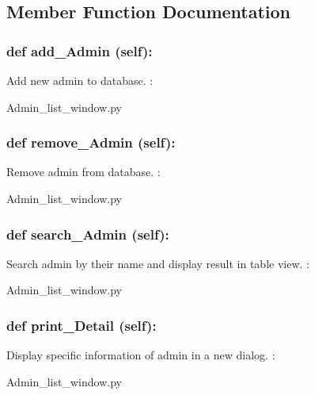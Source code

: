 \subsection{Member Function Documentation}
\hypertarget{class_poly_a14a7ad77ce612b0c54f531d307ee4b39}{
\subsubsection[{def add_Admin (self):}]{\setlength{\rightskip}{0pt plus 5cm}def {add\_Admin} (self):}}\label{class_poly_a14a7ad77ce612b0c54f531d307ee4b39}
Add new admin to database.
:\begin{DoxyCompactItemize}
\item 
Admin\_list\_window.\-py\end{DoxyCompactItemize}

\hypertarget{class_poly_a14a7ad77ce612b0c54f531d307ee4b39}{
\subsubsection[{def remove_Admin (self):}]{\setlength{\rightskip}{0pt plus 5cm}def {remove\_Admin} (self):}}\label{class_poly_a14a7ad77ce612b0c54f531d307ee4b39}
Remove admin from database.
:\begin{DoxyCompactItemize}
\item 
Admin\_list\_window.\-py\end{DoxyCompactItemize}

\hypertarget{class_poly_a14a7ad77ce612b0c54f531d307ee4b39}{
\subsubsection[{def search_Admin (self):}]{\setlength{\rightskip}{0pt plus 5cm}def {search\_Admin} (self):}}\label{class_poly_a14a7ad77ce612b0c54f531d307ee4b39}
Search admin by their name and display result in table view.
:\begin{DoxyCompactItemize}
\item 
Admin\_list\_window.\-py\end{DoxyCompactItemize}

\hypertarget{class_poly_a14a7ad77ce612b0c54f531d307ee4b39}{
\subsubsection[{def print_Detail (self):}]{\setlength{\rightskip}{0pt plus 5cm}def {print\_Detail} (self):}}\label{class_poly_a14a7ad77ce612b0c54f531d307ee4b39}
Display specific information of admin in a new dialog.
:\begin{DoxyCompactItemize}
\item 
Admin\_list\_window.\-py\end{DoxyCompactItemize}


